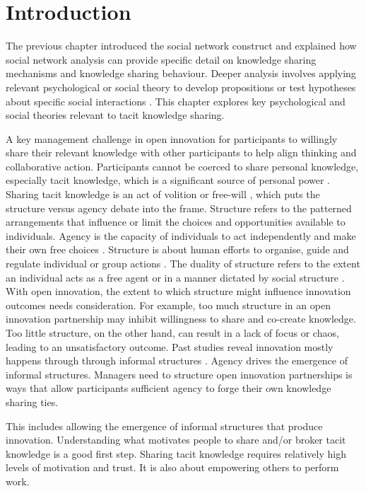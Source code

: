 
\section{Introduction}

The previous chapter introduced the social network construct and explained how social network analysis can provide specific detail on knowledge sharing mechanisms and knowledge sharing behaviour. Deeper analysis involves applying relevant psychological or social theory to develop propositions or test hypotheses about specific social interactions \citep{borgatti2013analyzing}. This chapter explores key psychological and social theories relevant to tacit knowledge sharing. \medskip

A key management challenge in open innovation for participants to willingly share their relevant knowledge with other participants to help align thinking and collaborative action. Participants cannot be coerced to share personal knowledge, especially tacit knowledge, which is a significant source of personal power \citep{haldin2000difficulties}. Sharing tacit knowledge is an act of volition or free-will \citep{leonard1998role}, which puts the structure versus agency debate into the frame. Structure refers to the patterned arrangements that influence or limit the choices and opportunities available to individuals. Agency is the capacity of individuals to act independently and make their own free choices \citep{barker2016cultural}. Structure is about human efforts to organise, guide and regulate individual or group actions \citep{bandura1999social}. The duality of structure refers to the extent an individual acts as a free agent or in a manner dictated by social structure \citep{giddens1984constitution,sewell1992theory}. With open innovation, the extent to which structure might influence innovation outcomes needs consideration. For example, too much structure in an open innovation partnership may inhibit willingness to share and co-create knowledge. Too little structure, on the other hand, can result in a lack of focus or chaos, leading to an unsatisfactory outcome. Past studies reveal innovation mostly happens through through informal structures \citep{allen1977role,ibarra1993network,selnes2003promoting}. Agency drives the emergence of informal structures. Managers need to structure open innovation partnerships is ways that allow participants sufficient agency to forge their own knowledge sharing ties. \medskip

This includes allowing the emergence of informal structures that produce innovation. Understanding what motivates people to share and/or broker tacit knowledge is a good first step. Sharing tacit knowledge requires relatively high levels of motivation and trust. It is also about empowering others to perform work. \medskip 


